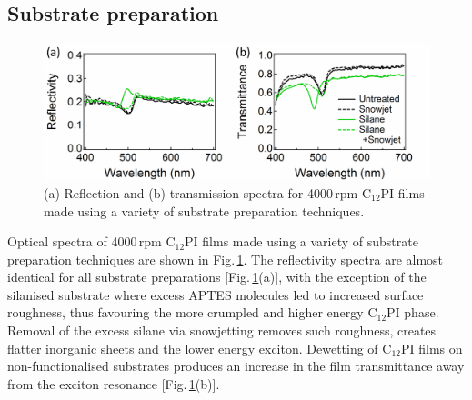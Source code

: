 \subsection{Substrate preparation}
\begin{figure}[h!]
\centering
\includegraphics[width=\textwidth]{Fig3}
\caption{(a) Reflection and (b) transmission spectra for 4000\,rpm C$_{12}$PI films made using a variety of substrate preparation techniques.}
\label{4Fig3}
\end{figure}
Optical spectra of 4000\,rpm C$_{12}$PI films made using a variety of substrate preparation techniques are shown in Fig.\,\ref{4Fig3}. The reflectivity spectra are almost identical for all substrate preparations [Fig.\,\ref{4Fig3}(a)], with the exception of the silanised substrate where excess APTES molecules led to increased surface roughness, thus favouring the more crumpled and higher energy C$_{12}$PI phase. Removal of the excess silane via snowjetting removes such roughness, creates flatter inorganic sheets and the lower energy exciton. Dewetting of C$_{12}$PI films on non-functionalised substrates produces an increase in the film transmittance away from the exciton resonance [Fig.\,\ref{4Fig3}(b)].

